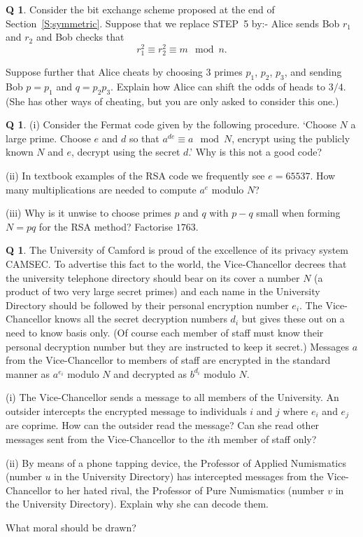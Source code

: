 \documentclass[12pt,a4paper]{article}
\theoremstyle{plain}
\theoremstyle{definition}
\newtheorem{question}[theorem]{Q}
\begin{document}
\begin{question}\label{Q;Alice cheats}\label{C4.12} 
Consider the bit exchange scheme
proposed at the end of Section~\ref{S;symmetric}.
Suppose that we replace STEP~5 by:- Alice sends Bob
$r_{1}$ and $r_{2}$ and Bob checks that 
\[r_{1}^{2}\equiv r_{2}^{2}\equiv m\mod{n}.\]
 
Suppose further that Alice cheats by
choosing $3$ primes $p_{1}$, $p_{2}$, $p_{3}$,
and sending Bob $p=p_{1}$ and $q=p_{2}p_{3}$.
Explain how Alice can shift the odds of heads
to $3/4$. (She has other ways of cheating, but
you are only asked to consider this one.)
\end{question}
\begin{question}\label{C4.13}
(i) Consider the Fermat code
given by the following procedure.
`Choose $N$ a large prime. Choose $e$ and $d$ so that
$a^{de}\equiv a \mod{N}$, encrypt using the publicly known
$N$ and $e$, decrypt using the secret $d$.'
Why is this not a good code?

(ii) In textbook examples of the RSA code we frequently see
$e=65537$. How many multiplications
are needed to
compute $a^{e}$ modulo $N$?

(iii) Why is it unwise to choose primes $p$ and $q$
with $p-q$ small when forming $N=pq$ for the RSA method?
Factorise $1763$.
\end{question}
\begin{question}\label{C4.14} The University of Camford is proud of 
the excellence of its privacy system CAMSEC. 
To advertise this
fact to the world, the Vice-Chancellor decrees that 
the university telephone directory should bear on its cover
a number $N$ (a product of two very large secret primes)
and each name in the University Directory should 
be followed by their personal encryption number $e_{i}$.
The Vice-Chancellor knows all the secret decryption numbers
$d_{i}$ but gives these out on a need to know basis only.
(Of course each member of staff must know their
personal decryption number but they are instructed to keep it secret.)
Messages $a$ from the Vice-Chancellor
to members of staff 
are encrypted in the standard manner
as $a^{e_{i}}$ modulo $N$ and decrypted
as $b^{d_{i}}$ modulo $N$.

(i) The Vice-Chancellor sends a message to
all members of the University.
An outsider intercepts the encrypted message to
individuals $i$ and $j$ where $e_{i}$ and $e_{j}$
are coprime. How can the outsider read the message?
Can she read other messages sent from the Vice-Chancellor
to the $i$th member of staff only?

(ii) By means of a phone tapping device,
the  Professor of Applied Numismatics
(number $u$ in the University Directory)
has intercepted messages from the
Vice-Chancellor to her
hated rival, the
Professor of Pure Numismatics
(number $v$ in the University Directory).
Explain why she can decode them.

What moral should be drawn?
\end{question}
  
\end{document}
